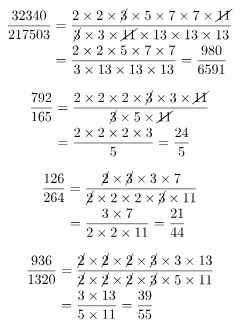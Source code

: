 {{\item\begin{align*}
    \frac{32340}{217503} &=
    \frac{2 \times 2 \times \cancel{3} \times 5 \times 7 \times 7 \times \cancel{11}}
    {\cancel{3} \times 3 \times \cancel{11} \times 13 \times 13 \times 13}\\ &=
    \frac{2 \times 2 \times 5 \times 7 \times 7}
    {3 \times 13 \times 13 \times 13} =
    \frac{980}{6591}
    \end{align*}

\item\begin{align*}
    \frac{792}{165} &=
    \frac{2 \times 2 \times 2 \times \cancel{3} \times 3 \times \cancel{11}}
    {\cancel{3} \times 5 \times \cancel{11}}\\ &=
    \frac{2 \times 2 \times 2 \times 3}
    {5} =
    \frac{24}{5}
    \end{align*}

\item\begin{align*}
    \frac{126}{264} &=
    \frac{\cancel{2} \times \cancel{3} \times 3 \times 7}
    {\cancel{2} \times 2 \times 2 \times \cancel{3} \times 11}\\ &=
    \frac{3 \times 7}
    {2 \times 2 \times 11} =
    \frac{21}{44}
    \end{align*}

\item\begin{align*}
    \frac{936}{1320} &=
    \frac{\cancel{2} \times \cancel{2} \times \cancel{2} \times \cancel{3} \times 3 \times 13}
    {\cancel{2} \times \cancel{2} \times \cancel{2} \times \cancel{3} \times 5 \times 11}\\ &=
    \frac{3 \times 13}
    {5 \times 11} =
    \frac{39}{55}
    \end{align*}

}}